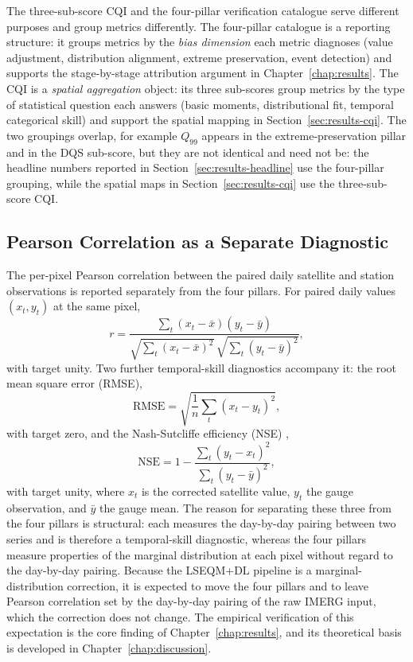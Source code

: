 The three-sub-score CQI and the four-pillar verification
catalogue serve different purposes and group metrics
differently. The four-pillar catalogue is a reporting structure:
it groups metrics by the \textit{bias dimension} each metric
diagnoses (value adjustment, distribution alignment, extreme
preservation, event detection) and supports the stage-by-stage
attribution argument in Chapter~\ref{chap:results}. The CQI is a
\textit{spatial aggregation} object: its three sub-scores group
metrics by the type of statistical question each answers (basic
moments, distributional fit, temporal categorical skill) and
support the spatial mapping in
Section~\ref{sec:results-cqi}. The two groupings overlap, for
example $Q_{99}$ appears in the extreme-preservation pillar and
in the DQS sub-score, but they are not identical and need not
be: the headline numbers reported in
Section~\ref{sec:results-headline} use the four-pillar grouping,
while the spatial maps in Section~\ref{sec:results-cqi} use the
three-sub-score CQI.

\subsection{Pearson Correlation as a Separate Diagnostic}

The per-pixel Pearson correlation between the paired daily
satellite and station observations is reported separately from
the four pillars. For paired daily values $(x_t, y_t)$ at the
same pixel,
\begin{equation}
r = \frac{\sum_t (x_t - \bar{x})(y_t - \bar{y})}
         {\sqrt{\sum_t (x_t - \bar{x})^2}\,
          \sqrt{\sum_t (y_t - \bar{y})^2}},
\label{eq:pearson}
\end{equation}
with target unity. Two further temporal-skill diagnostics
accompany it: the root mean square error (RMSE),
\begin{equation}
\text{RMSE} = \sqrt{\frac{1}{n}\sum_t (x_t - y_t)^2},
\label{eq:rmse}
\end{equation}
with target zero, and the Nash-Sutcliffe efficiency (NSE)
\citep{ref:nashsutcliffe1970},
\begin{equation}
\text{NSE} = 1 - \frac{\sum_t (y_t - x_t)^2}
                      {\sum_t (y_t - \bar{y})^2},
\label{eq:nse}
\end{equation}
with target unity, where $x_t$ is the corrected satellite value,
$y_t$ the gauge observation, and $\bar{y}$ the gauge mean. The
reason for separating these three from the four pillars is
structural: each measures the day-by-day pairing between two
series and is therefore a temporal-skill diagnostic, whereas the
four pillars measure properties of the marginal distribution at
each pixel without regard to the day-by-day pairing. Because the
LSEQM+DL pipeline is a marginal-distribution correction, it is
expected to move the four pillars and to leave Pearson
correlation set by the day-by-day pairing of the raw IMERG
input, which the correction does not change. The empirical verification of this expectation is the
core finding of Chapter~\ref{chap:results}, and its theoretical
basis is developed in Chapter~\ref{chap:discussion}.


